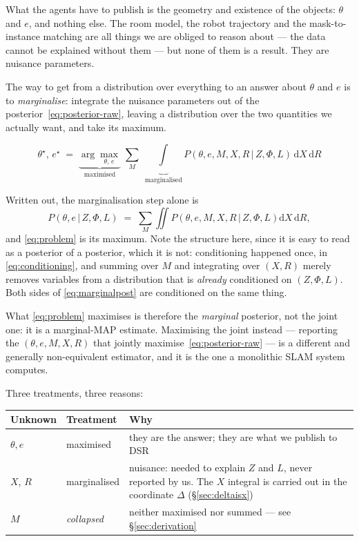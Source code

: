 \documentclass[11pt,a4paper]{report}
\newcommand{\given}{\,|\,}
\theoremstyle{definition}   %
\begin{document}
What the agents have to publish is the geometry and existence of the objects: $\theta$ and $e$,
and nothing else. The room model, the robot trajectory and the mask-to-instance matching are all
things we are obliged to reason about --- the data cannot be explained without them --- but none
of them is a result. They are nuisance parameters.

The way to get from a distribution over everything to an answer about $\theta$ and $e$ is to
\emph{marginalise}: integrate the nuisance parameters out of the posterior~\eqref{eq:posterior-raw},
leaving a distribution over the two quantities we actually want, and take its maximum.

\begin{equation}
\boxed{\;
\theta^\star,\,e^\star
\;=\;
\underbrace{\arg\max_{\theta,\,e}}_{\text{maximised}}\;
\sum_{M}\;
\underbrace{\int}_{\text{marginalised}}
P\!\left(\theta,e,M,X,R \given Z,\Phi,L\right)\,
\mathrm{d}X\,\mathrm{d}R \; }
\label{eq:problem}
\end{equation}

\noindent
Written out, the marginalisation step alone is
\begin{equation}
P\!\left(\theta,e\given Z,\Phi,L\right)\;=\;\sum_M\iint
P\!\left(\theta,e,M,X,R\given Z,\Phi,L\right)\mathrm{d}X\,\mathrm{d}R ,
\label{eq:marginalpost}
\end{equation}
and \eqref{eq:problem} is its maximum. Note the structure here, since it is easy to read as a
posterior of a posterior, which it is not:
conditioning happened once, in \eqref{eq:conditioning}, and summing over $M$ and integrating over
$(X,R)$ merely removes variables from a distribution that is \emph{already} conditioned on
$(Z,\Phi,L)$. Both sides of \eqref{eq:marginalpost} are conditioned on the same thing.

What \eqref{eq:problem} maximises is therefore the \emph{marginal} posterior, not the joint one:
it is a marginal-MAP estimate. Maximising the joint instead --- reporting the $(\theta,e,M,X,R)$ that
jointly maximise~\eqref{eq:posterior-raw} --- is a different and generally non-equivalent
estimator, and it is the one a monolithic SLAM system computes.

Three treatments, three reasons:
\begin{center}
\begin{tabular}{@{}llp{8.1cm}@{}}
\toprule
Unknown & Treatment & Why \\
\midrule
$\theta,e$ & maximised & they are the answer; they are what we publish to DSR \\[2pt]
$X$, $R$   & marginalised & nuisance: needed to explain $Z$ and $L$, never reported by us. The
                            $X$ integral is carried out in the coordinate $\Delta$
                            (\S\ref{sec:deltaisx}) \\[2pt]
$M$        & \emph{collapsed} & neither maximised nor summed --- see \S\ref{sec:derivation} \\
\bottomrule
\end{tabular}
\end{center}
\end{document}
